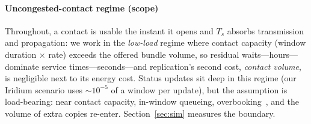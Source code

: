 \documentclass[twocolumn,3p,times,procedia]{elsarticle}
\begin{document}
\paragraph*{Uncongested-contact regime (scope)}
Throughout, a contact is usable the instant it opens and $T_s$ absorbs
transmission and propagation: we work in the \emph{low-load} regime
where contact capacity (window duration $\times$ rate) exceeds the
offered bundle volume, so residual waits---hours---dominate service
times---seconds---and replication's second cost, \emph{contact volume},
is negligible next to its energy cost. Status updates sit deep in this
regime (our Iridium scenario uses ${\sim}10^{-5}$ of a window per
update), but the assumption is load-bearing: near contact capacity,
in-window queueing, overbooking~\cite{bezirgiannidis}, and the volume
of extra copies re-enter. Section~\ref{sec:sim} measures the boundary.
\end{document}
